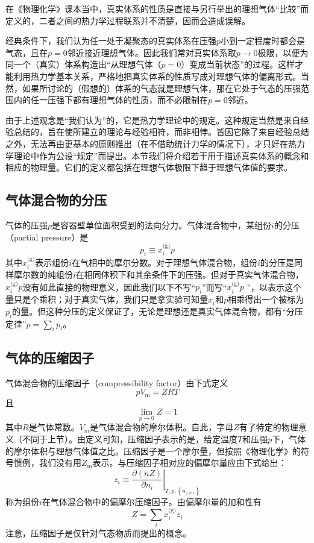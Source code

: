 \documentclass[main.tex]{subfiles}
\begin{document}
在《物理化学》课本当中，真实体系的性质是直接与另行举出的理想气体“比较”而定义的，二者之间的热力学过程联系并不清楚，因而会造成误解。

经典条件下，我们认为任一处于凝聚态的真实体系在压强$p$小到一定程度时都会是气态，且在$p=0$邻近接近理想气体。因此我们常对真实体系取$p\rightarrow 0$极限，以便为同一个（真实）体系构造出“从理想气体（$p=0$）变成当前状态”的过程。这样才能利用热力学基本关系，严格地把真实体系的性质写成对理想气体的偏离形式。当然，如果所讨论的（假想的）体系的气态就是理想气体，那在它处于气态的压强范围内的任一压强下都有理想气体的性质，而不必限制在$p=0$邻近。

由于上述观念是“我们认为”的，它是热力学理论中的规定。这种规定当然是来自经验总结的，旨在使所建立的理论与经验相符，而非相悖。皆因它除了来自经验总结之外，无法再由更基本的原则推出（在不借助统计力学的情况下），才只好在热力学理论中作为公设“规定”而提出。本节我们将介绍若干用于描述真实体系的概念和相应的物理量。它们的定义都包括在理想气体极限下趋于理想气体值的要求。

\subsection{气体混合物的分压}
气体的压强$p$是容器壁单位面积受到的法向分力。气体混合物中，某组份$i$的分压（partial pressure）是
\[p_i\equiv x_i^\text{(g)}p\]
其中$x_i^\text{(g)}$表示组份$i$在气相中的摩尔分数。对于理想气体混合物，组份$i$的分压是同样摩尔数的纯组份$i$在相同体积下和其余条件下的压强。但对于真实气体混合物，$x_i^\text{(g)}p$没有如此直接的物理意义，因此我们以下不写“$p_i$”而写“$x_i^\text{(g)}p$
”，以表示这个量只是个乘积；对于真实气体，我们只是拿实验可知量$x_i$和$p$相乘得出一个被标为$p_i$的量。但这种分压的定义保证了，无论是理想还是真实气体混合物，都有“分压定律”$p=\sum_i p_i$。

\subsection{气体的压缩因子}
气体混合物的压缩因子（compressibility factor）由下式定义
\[pV_\text{m}=ZRT\]
且
\[\lim_{p\to 0}Z=1\]
其中$R$是气体常数。$V_m$是气体混合物的摩尔体积。自此，字母$Z$有了特定的物理意义（不同于上节）。由定义可知，压缩因子表示的是，给定温度$T$和压强$p$下，气体的摩尔体积与理想气体值之比。压缩因子是一个摩尔量，但按照《物理化学》的符号惯例，我们没有用$Z_\text{m}$表示。与压缩因子相对应的偏摩尔量应由下式给出：
\[z_i\equiv\left.\frac{\partial\left(n Z\right)}{\partial n_i}\right|_{T,p,\left\{n_{j\neq i}\right\}}\]
称为组份$i$在气体混合物中的偏摩尔压缩因子。由偏摩尔量的加和性有
\[Z=\sum_i x_i^\text{(g)}z_i\]
注意，压缩因子是仅针对气态物质而提出的概念。
\end{document}
